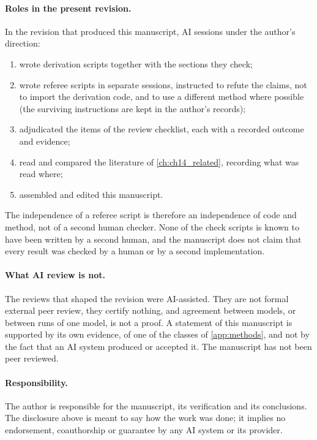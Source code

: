 \paragraph{Roles in the present revision.} In the revision that produced this manuscript, AI sessions under the author's direction:
\begin{enumerate}[label=(\roman*),leftmargin=2.2em]
\item wrote derivation scripts together with the sections they check;
\item wrote referee scripts in separate sessions, instructed to refute the claims, not to import the derivation code, and to use a different
method where possible (the surviving instructions are kept in the author's records);
\item adjudicated the items of the review checklist, each with a recorded outcome and evidence;
\item read and compared the literature of \cref{ch:ch14_related}, recording what was read where;
\item assembled and edited this manuscript.
\end{enumerate}
The independence of a referee script is therefore an independence of code and method, not of a second human checker. None of the check
scripts is known to have been written by a second human, and the manuscript does not claim that every result was checked by a human or by a
second implementation.

\paragraph{What AI review is not.} The reviews that shaped the revision were AI-assisted. They are not formal external peer review, they
certify nothing, and agreement between models, or between runs of one model, is not a proof. A statement of this manuscript is supported
by its own evidence, of one of the classes of \cref{app:methods}, and not by the fact that an AI system produced or accepted it. The
manuscript has not been peer reviewed.

\paragraph{Responsibility.} The author is responsible for the manuscript, its verification and its conclusions. The disclosure above is meant
to say how the work was done; it implies no endorsement, coauthorship or guarantee by any AI system or its provider.

